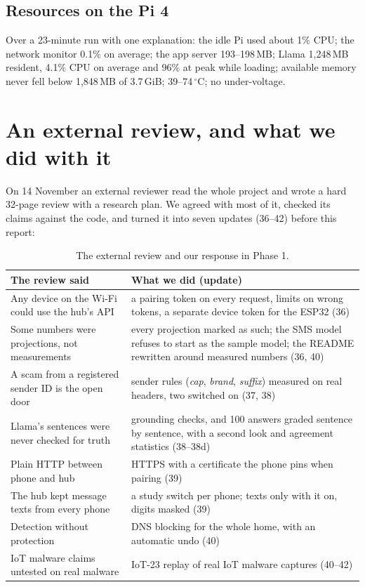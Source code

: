 \documentclass[11pt,a4paper]{article}
\begin{document}
\subsection{Resources on the Pi 4}

Over a 23-minute run with one explanation: the idle Pi used about 1\% CPU; the network monitor 0.1\% on average; the app
server 193--198\,MB; Llama 1,248\,MB resident, 4.1\% CPU on average and 96\% at peak while loading; available memory never
fell below 1,848\,MB of 3.7\,GiB; 39--74\,$^\circ$C; no under-voltage.

\section{An external review, and what we did with it}
\label{sec:review}

On 14 November an external reviewer read the whole project and wrote a hard 32-page review with a research plan. We agreed
with most of it, checked its claims against the code, and turned it into seven updates (36--42) before this report:

\begin{table}[H]
\centering\small
\begin{tabularx}{\textwidth}{@{}>{\raggedright\arraybackslash}p{5.2cm}X@{}}
\toprule
\textbf{The review said} & \textbf{What we did (update)}\\
\midrule
Any device on the Wi-Fi could use the hub's API & a pairing token on every request, limits on wrong tokens, a separate device token for the ESP32 (36)\\
Some numbers were projections, not measurements & every projection marked as such; the SMS model refuses to start as the sample model; the README rewritten around measured numbers (36, 40)\\
A scam from a registered sender ID is the open door & sender rules (\emph{cap}, \emph{brand}, \emph{suffix}) measured on real headers, two switched on (37, 38)\\
Llama's sentences were never checked for truth & grounding checks, and 100 answers graded sentence by sentence, with a second look and agreement statistics (38--38d)\\
Plain HTTP between phone and hub & HTTPS with a certificate the phone pins when pairing (39)\\
The hub kept message texts from every phone & a study switch per phone; texts only with it on, digits masked (39)\\
Detection without protection & DNS blocking for the whole home, with an automatic undo (40)\\
IoT malware claims untested on real malware & IoT-23 replay of real IoT malware captures (40--42)\\
\bottomrule
\end{tabularx}
\caption{The external review and our response in Phase 1.}
\end{table}
\end{document}
